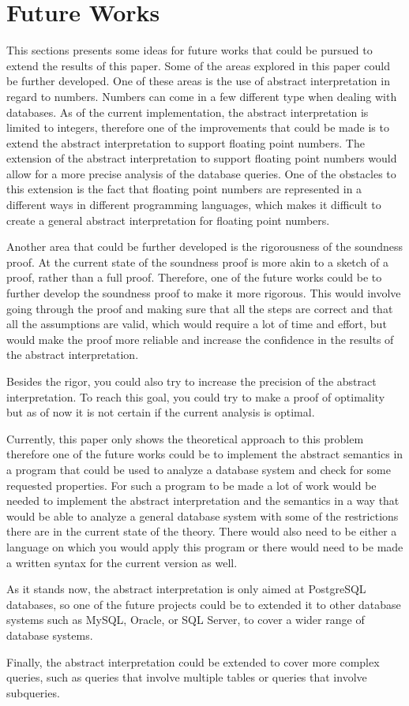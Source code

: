 \section{Future Works}\label{sec:future-works}
This sections presents some ideas for future works that could be pursued to extend the results of this paper.
Some of the areas explored in this paper could be further developed.
One of these areas is the use of abstract interpretation in regard to numbers.
Numbers can come in a few different type when dealing with databases.
As of the current implementation, the abstract interpretation is limited to integers, therefore one of the improvements that could be made is to extend the abstract interpretation to support floating point numbers.
The extension of the abstract interpretation to support floating point numbers would allow for a more precise analysis of the database queries.
One of the obstacles to this extension is the fact that floating point numbers are represented in a different ways in different programming languages, which makes it difficult to create a general abstract interpretation for floating point numbers.

Another area that could be further developed is the rigorousness of the soundness proof.
At the current state of the soundness proof is more akin to a sketch of a proof, rather than a full proof.
Therefore, one of the future works could be to further develop the soundness proof to make it more rigorous.
This would involve going through the proof and making sure that all the steps are correct and that all the assumptions are valid, which would require a lot of time and effort, but would make the proof more reliable and increase the confidence in the results of the abstract interpretation.

Besides the rigor, you could also try to increase the precision of the abstract interpretation.
To reach this goal, you could try to make a proof of optimality but as of now it is not certain if the current analysis is optimal.

Currently, this paper only shows the theoretical approach to this problem therefore one of the future works could be to implement the abstract semantics in a program that could be used to analyze a database system and check for some requested properties.
For such a program to be made a lot of work would be needed to implement the abstract interpretation and the semantics in a way that would be able to analyze a general database system with some of the restrictions there are in the current state of the theory.
There would also need to be either a language on which you would apply this program or there would need to be made a written syntax for the current version as well.

As it stands now, the abstract interpretation is only aimed at PostgreSQL databases, so one of the future projects could be to extended it to other database systems such as MySQL, Oracle, or SQL Server, to cover a wider range of database systems.

Finally, the abstract interpretation could be extended to cover more complex queries, such as queries that involve multiple tables or queries that involve subqueries.